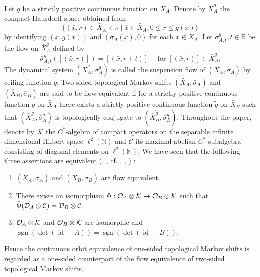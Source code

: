 \documentclass[11pt]{article}
\theoremstyle{plain}
\theoremstyle{definition}
\numberwithin{equation}{section}
\renewcommand{\labelenumi}{\textup{(\theenumi)}}
\newcommand{\BF}{\operatorname{BF}}
\newcommand{\id}{\operatorname{id}}
\newcommand{\sgn}{\operatorname{sgn}}
\def\det{{{\operatorname{det}}}}
\newcommand{\N}{\mathbb{N}}
\newcommand{\R}{\mathbb{R}}
\begin{document}
Let $g$ be a strictly positive continuous function on $\bar{X}_A$.
Denote by 
$\bar{X}_A^g$
the compact Hausdorff space obtained from
\begin{equation*}
\{ (\bar{x}, r ) \in \bar{X}_A\times\R \mid \bar{x}\in\bar{X}_A,
0 \le r \le g(x) \} 
\end{equation*}
by identifying
$(\bar{x}, g(\bar{x}))$
and
$(\bar{\sigma}_A(\bar{x}),0)$
for each $\bar{x} \in \bar{X}_A$.
Let
$
\bar{\sigma}_{A,t}^g, t \in \R
$
be the flow on
$\bar{X}_A^g$
defined by 
\begin{equation*}
\bar{\sigma}_{A,t}^g([(\bar{x},r)]) 
=[(\bar{x},r+t)]
\quad
\text{ for }
[(\bar{x},r)] \in \bar{X}_A^g.
\end{equation*}
The dynamical system
$(\bar{X}_A^g, \bar{\sigma}_A^g)$
is called the suspension flow of 
$(\bar{X}_A, \bar{\sigma}_A)$
by ceiling function $g$.
Two-sided topological Markov shifts
$(\bar{X}_A, \bar{\sigma}_A)$
and
$(\bar{X}_B, \bar{\sigma}_B)$
are said to be flow equivalent if 
for a strictly positive continuous function $g$ on $\bar{X}_A$
there exists 
a strictly positive continuous function $\tilde{g}$ on $\bar{X}_B$
such that 
$(\bar{X}_A^g, \bar{\sigma}_A^g)$
is topologically conjugate to
$(\bar{X}_B^{\tilde{g}}, \bar{\sigma}_B^{\tilde{g}})$.
Throughout the paper,
denote by
${\mathcal{K}}$
the $C^*$-algebra of compact operators on 
the separable infinite dimensional Hilbert space
$\ell^2(\N)$
and
${\mathcal{C}}$
its maximal abelian  $C^*$-subalgebra consisting of diagonal elements on
$\ell^2(\N)$.
We have seen that 
the following three assertions are equivalent
(\cite{MMKyoto}, \cite{Franks}, \cite{Ro}
cf. \cite{BF}, \cite{CK}, \cite{PS}) :
\begin{enumerate}
\renewcommand{\theenumi}{\roman{enumi}}
\renewcommand{\labelenumi}{\textup{(\theenumi)}}
\item
 $(\bar{X}_A, \bar{\sigma}_A)$ and 
 $(\bar{X}_B, \bar{\sigma}_B)$ 
are flow equivalent.
\item There exists an isomorphism 
$\bar{\Phi}:{{\mathcal{O}}_A}\otimes{\mathcal{K}}\to{{\mathcal{O}}_B}\otimes{\mathcal{K}}$ 
such that $\bar{\Phi}({{\mathcal{D}}_A}\otimes{\mathcal{C}})={{\mathcal{D}}_B}\otimes{\mathcal{C}}$. 
\item ${{\mathcal{O}}_A}\otimes{\mathcal{K}}$ and ${{\mathcal{O}}_B}\otimes{\mathcal{K}}$ 
are isomorphic and $\sgn(\det(\id-A))= \sgn(\det(\id-B))$. 
\end{enumerate}
Hence the continuous orbit equivalence of one-sided topological Markov shifts
is regarded as a one-sided counterpart of 
the flow equivalence of two-sided topological Markov shifts.
 
\end{document}
